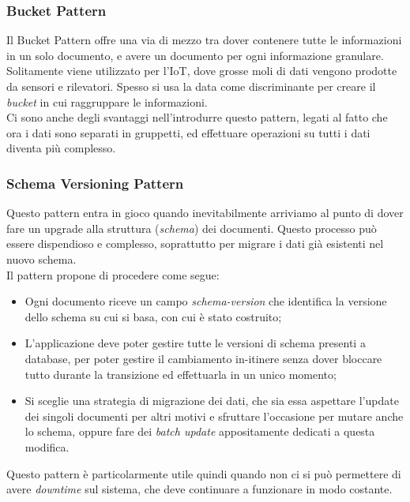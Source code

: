 \subsubsection{Bucket Pattern}
Il Bucket Pattern offre una via di mezzo tra dover contenere tutte le informazioni in un solo documento, e avere un documento per ogni informazione granulare.\\
Solitamente viene utilizzato per l'\gls{IoT}, dove grosse moli di dati vengono prodotte da sensori e rilevatori. Spesso si usa la data come discriminante per creare il \textit{bucket} in cui raggruppare le informazioni.\\
Ci sono anche degli svantaggi nell'introdurre questo pattern, legati al fatto che ora i dati sono separati in gruppetti, ed effettuare operazioni su tutti i dati diventa più complesso.\\

\subsubsection{Schema Versioning Pattern}
Questo pattern entra in gioco quando inevitabilmente arriviamo al punto di dover fare un upgrade alla struttura (\textit{schema}) dei documenti. Questo processo può essere dispendioso e complesso, soprattutto per migrare i dati già esistenti nel nuovo schema.\\
Il pattern propone di procedere come segue:
\begin{itemize}
    \item Ogni documento riceve un campo \textit{schema-version} che identifica la versione dello schema su cui si basa, con cui è stato costruito;
    \item L'applicazione deve poter gestire tutte le versioni di schema presenti a database, per poter gestire il cambiamento in-itinere senza dover bloccare tutto durante la transizione ed effettuarla in un unico momento;
    \item Si sceglie una strategia di migrazione dei dati, che sia essa aspettare l'update dei singoli documenti per altri motivi e sfruttare l'occasione per mutare anche lo schema, oppure fare dei \textit{batch update} appositamente dedicati a questa modifica.
\end{itemize}
\noindent Questo pattern è particolarmente utile quindi quando non ci si può permettere di avere \textit{downtime} sul sistema, che deve continuare a funzionare in modo costante.\\

